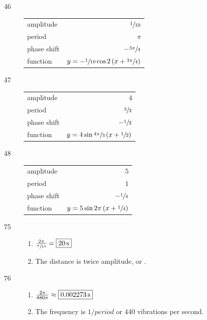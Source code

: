 \documentclass{exam}
\begin{document}
\begin{description}
    \item[46]
      \begin{tabular}[H]{lr}
        \toprule
        amplitude   & $\sfrac{1}{10}$ \\
        period      & $\pi$ \\
        phase shift & $- \sfrac{3 \pi}{4}$ \\
        function    & $y = - \sfrac{1}{10} \cos 2 \left( x + \sfrac{3 \pi}{4} \right)$ \\
        \bottomrule
      \end{tabular}

    \item[47]
      \begin{tabular}[H]{lr}
        \toprule
        amplitude   & $4$ \\
        period      & $\sfrac{3}{2}$ \\
        phase shift & $- \sfrac{1}{2}$ \\
        function    & $y = 4 \sin \sfrac{4 \pi}{3} \left( x + \sfrac{1}{2} \right)$ \\
        \bottomrule
      \end{tabular}

    \item[48]
      \begin{tabular}[H]{lr}
        \toprule
        amplitude   & $5$ \\
        period      & $1$ \\
        phase shift & $- \sfrac{1}{4}$ \\
        function    & $y = 5 \sin 2 \pi \left( x + \sfrac{1}{4} \right)$ \\
        \bottomrule
      \end{tabular}

    \item[75]
      \begin{enumerate}[a]
        \item $\frac{2 \pi}{\sfrac{\pi}{10}} = \boxed{ \unit[20]{s} }$
        \item The distance is twice amplitude, or .
      \end{enumerate}

    \item[76]
      \begin{enumerate}[a]
        \item $\frac{2 \pi}{880 \pi} \approx \boxed{ \unit[ 0.002273 ]{s} }$
        \item The frequency is $1/period$ or 440 vibrations per second.


\end{enumerate}
\end{description}
\end{document}
